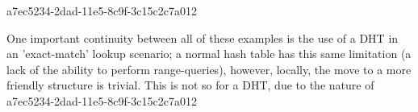 \documentclass[12pt]{article}
\begin{document}
a7ec5234-2dad-11e5-8c9f-3c15c2c7a012
\par One important continuity between all of these examples is the use of a DHT in an 'exact-match' lookup scenario; a normal hash table has this same limitation (a lack of the ability to perform range-queries), however, locally, the move to a more friendly structure is trivial. This is not so for a DHT, due to the nature of
a7ec5234-2dad-11e5-8c9f-3c15c2c7a012\printbibliography
\end{document}
